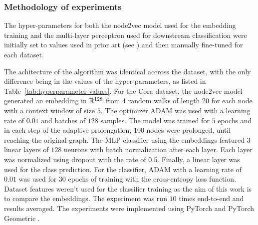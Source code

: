 \subsubsection{Methodology of experiments}

The hyper-parameters for both the node2vec model used for the embedding training and the multi-layer perceptron used for downstream classification were initially set to values used in prior art (see \cite{hu_open_2021,fey_fast_2019}) and then manually fine-tuned for each dataset.

The achitecture of the algorithm was identical accross the dataset, with the only difference being in the values of the hyper-parameters, as listed in Table~\ref{tab:hyperparameter-values}. For the Cora dataset, the node2vec model generated an embedding in \( \mathbb{R}^{128} \) from \( 4 \) random walks of length \( 20 \) for each node with a context window of size \( 5 \). The optimizer ADAM \cite{kingma_adam:_2017} was used with a learning rate of \( 0.01 \) and batches of \( 128 \) samples. The model was trained for \( 5 \) epochs and in each step of the adaptive prolongation, \( 100 \) nodes were prolonged, until reaching the original graph. The MLP classifier using the embeddings featured \( 3 \) linear layers of \( 128 \) neurons with batch normalization after each layer. Each layer was normalized using dropout \cite{srivastava_dropout_2014} with the rate of \( 0.5 \). Finally, a linear layer was used for the class prediction. For the classifier, ADAM with a learning rate of \( 0.01 \) was used for \( 30 \) epochs of training with the cross-entropy loss function. Dataset features weren't used for the classifier training as the aim of this work is to compare the embeddings. The experiment was run \( 10 \) times end-to-end and results averaged. The experiments were implemented using PyTorch \cite{paszke_pytorch_2019} and PyTorch Geometric \cite{fey_fast_2019}.

